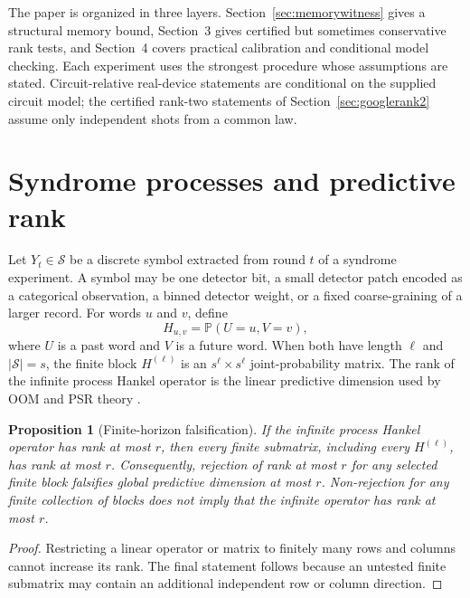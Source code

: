 \documentclass[11pt]{article}
\newtheorem{proposition}[theorem]{Proposition}
\newcommand{\Prob}{\mathbb{P}}
\newcommand{\cS}{\mathcal{S}}
\begin{document}
The paper is organized in three layers. Section~\ref{sec:memorywitness} gives a structural memory bound, Section~3 gives certified but sometimes conservative rank tests, and Section~4 covers practical calibration and conditional model checking. Each experiment uses the strongest procedure whose assumptions are stated. Circuit-relative real-device statements are conditional on the supplied circuit model; the certified rank-two statements of Section~\ref{sec:googlerank2} assume only independent shots from a common law.

\section{Syndrome processes and predictive rank}

Let $Y_t\in\cS$ be a discrete symbol extracted from round $t$ of a syndrome experiment. A symbol may be one detector bit, a small detector patch encoded as a categorical observation, a binned detector weight, or a fixed coarse-graining of a larger record. For words $u$ and $v$, define
\begin{equation}
    H_{u,v}=\Prob(U=u,V=v),
    \label{eq:hankel}
\end{equation}
where $U$ is a past word and $V$ is a future word. When both have length $\ell$ and $|\cS|=s$, the finite block $H^{(\ell)}$ is an $s^\ell\times s^\ell$ joint-probability matrix. The rank of the infinite process Hankel operator is the linear predictive dimension used by OOM and PSR theory \cite{jaeger2000oom,littman2001psr,singh2012psr}.

\begin{proposition}[Finite-horizon falsification]
\label{prop:finitehorizon}
If the infinite process Hankel operator has rank at most $r$, then every finite submatrix, including every $H^{(\ell)}$, has rank at most $r$. Consequently, rejection of rank at most $r$ for any selected finite block falsifies global predictive dimension at most $r$. Non-rejection for any finite collection of blocks does not imply that the infinite operator has rank at most $r$.
\end{proposition}

\begin{proof}
Restricting a linear operator or matrix to finitely many rows and columns cannot increase its rank. The final statement follows because an untested finite submatrix may contain an additional independent row or column direction.
\end{proof}
\end{document}
